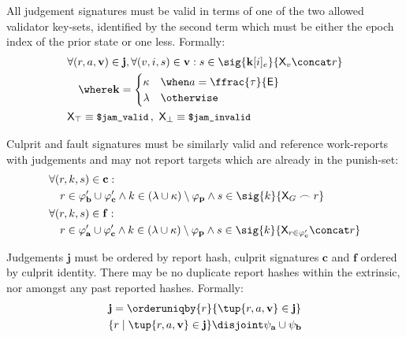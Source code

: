 All judgement signatures must be valid in terms of one of the two allowed validator key-sets, identified by the second term which must be either the epoch index of the prior state or one less. Formally:
\begin{align}
  &\begin{aligned}
    &\forall (r, a, \mathbf{v}) \in \mathbf{j}, \forall (v, i, s) \in \mathbf{v} : s \in \sig{\mathbf{k}[i]_e}{\mathsf{X}_v \concat r}\\
    &\quad\where \mathbf{k} = \begin{cases}
      \kappa &\when a = \displaystyle \ffrac{\tau}{\mathsf{E}}\\
      \lambda &\otherwise\\
    \end{cases}
  \end{aligned}\\
  &\mathsf{X}_\top \equiv \text{{\small \texttt{\$jam\_valid}}}\,,\ \mathsf{X}_\bot \equiv \text{{\small \texttt{\$jam\_invalid}}}
\end{align}

Culprit and fault signatures must be similarly valid and reference work-reports with judgements and may not report targets which are already in the punish-set:
\begin{align}
  &\begin{aligned}
      &\forall (r, k, s) \in \mathbf{c} :\\
      &\quad r \in \varphi'_\mathbf{b} \cup \varphi'_\mathbf{c} \wedge
      k \in (\lambda \cup \kappa) \setminus \varphi_\mathbf{p} \wedge
      s \in \sig{k}{\mathsf{X}_G \frown r}
  \end{aligned}\\
  &\begin{aligned}
      &\forall (r, k, s) \in \mathbf{f} :\\
      &\quad r \in \varphi'_\mathbf{a} \cup \varphi'_\mathbf{c} \wedge
      k \in (\lambda \cup \kappa) \setminus \varphi_\mathbf{p} \wedge
      s \in \sig{k}{\mathsf{X}_{r \in \varphi'_\mathbf{c}} \concat r}\\
  \end{aligned}
\end{align}

Judgements $\mathbf{j}$ must be ordered by report hash, culprit signatures $\mathbf{c}$ and $\mathbf{f}$ ordered by culprit identity. There may be no duplicate report hashes within the extrinsic, nor amongst any past reported hashes. Formally:
\begin{align}
  &\mathbf{j} = \orderuniqby{r}{\tup{r, a, \mathbf{v}} \in \mathbf{j}}\\
  &\{r \mid \tup{r, a, \mathbf{v}} \in \mathbf{j}\} \disjoint \psi_\mathbf{a} \cup \psi_\mathbf{b}
\end{align}

